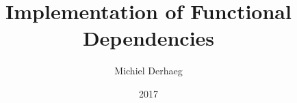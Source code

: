 \documentclass[]{article}
\author{Michiel Derhaeg}
\title{Implementation of Functional Dependencies}
\date{2017}
\begin{document}
\maketitle
\tableofcontents









{}

\end{document}
